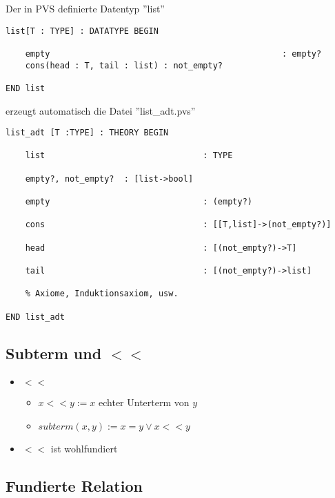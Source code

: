 \documentclass{scrartcl}
\begin{document}
\pagebreak
Der in PVS definierte Datentyp ''list''

\begin{lstlisting}
list[T : TYPE] : DATATYPE BEGIN

	empty												: empty?
	cons(head : T, tail : list)	: not_empty?

END list
\end{lstlisting}

erzeugt automatisch die Datei ''list\_adt.pvs''

\begin{lstlisting}
list_adt [T :TYPE] : THEORY BEGIN

	list								: TYPE
	
	empty?, not_empty?	: [list->bool]
	
	empty								: (empty?)
	
	cons								: [[T,list]->(not_empty?)]
	
	head								: [(not_empty?)->T]
	
	tail								: [(not_empty?)->list]
	
	% Axiome, Induktionsaxiom, usw.

END list_adt
\end{lstlisting}

\subsection{Subterm und $ << $}

\begin{itemize}
	\item $ << $
	\begin{itemize}
		\item $ x << y := x $ echter Unterterm von $ y $
		\item $ subterm(x,y) := x = y \vee x << y $
	\end{itemize}
	\item $ << $ ist wohlfundiert
\end{itemize}

\subsection{Fundierte Relation}
\end{document}
